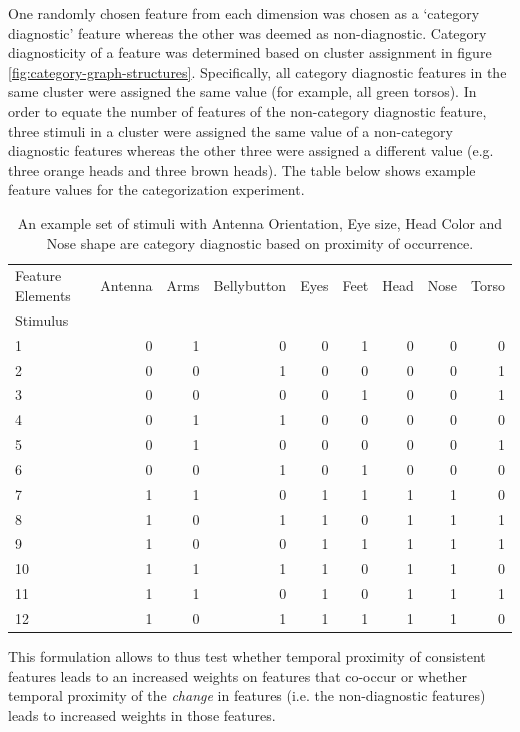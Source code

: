 One randomly chosen feature from each dimension was chosen as a `category diagnostic' feature whereas the other was deemed as non-diagnostic. Category diagnosticity of a feature was determined based on cluster assignment in figure \ref{fig:category-graph-structures}. Specifically, all category diagnostic features in the same cluster were assigned the same value (for example, all green torsos). In order to equate the number of features of the non-category diagnostic feature, three stimuli in a cluster were assigned the same value of a non-category diagnostic features whereas the other three were assigned a different value (e.g. three orange heads and three brown heads). The table below shows example feature values for the categorization experiment. 

\begin{table}
\centering
\caption{An example set of stimuli with Antenna Orientation, Eye size, Head Color and Nose shape are category diagnostic based on proximity of occurrence.}
\label{tab:category-features-example}
\begin{tabular}{lrrrrrrrr}
    \toprule
    Feature Elements & Antenna & Arms & Bellybutton & Eyes & Feet & Head & Nose & Torso \\
    Stimulus &  &  &  &  &  &  &  &  \\
    \midrule
    1 & 0 & 1 & 0 & 0 & 1 & 0 & 0 & 0 \\
    2 & 0 & 0 & 1 & 0 & 0 & 0 & 0 & 1 \\
    3 & 0 & 0 & 0 & 0 & 1 & 0 & 0 & 1 \\
    4 & 0 & 1 & 1 & 0 & 0 & 0 & 0 & 0 \\
    5 & 0 & 1 & 0 & 0 & 0 & 0 & 0 & 1 \\
    6 & 0 & 0 & 1 & 0 & 1 & 0 & 0 & 0 \\
    7 & 1 & 1 & 0 & 1 & 1 & 1 & 1 & 0 \\
    8 & 1 & 0 & 1 & 1 & 0 & 1 & 1 & 1 \\
    9 & 1 & 0 & 0 & 1 & 1 & 1 & 1 & 1 \\
    10 & 1 & 1 & 1 & 1 & 0 & 1 & 1 & 0 \\
    11 & 1 & 1 & 0 & 1 & 0 & 1 & 1 & 1 \\
    12 & 1 & 0 & 1 & 1 & 1 & 1 & 1 & 0 \\
    \bottomrule
\end{tabular}

\end{table}

This formulation allows to thus test whether temporal proximity of consistent features leads to an increased weights on features that co-occur or whether temporal proximity of the \textit{change} in features (i.e. the non-diagnostic features) leads to increased weights in those features. 


